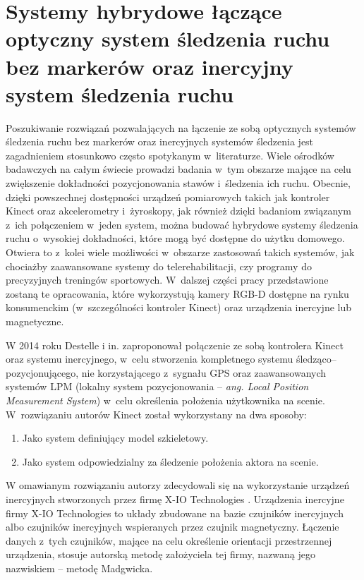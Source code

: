 \section{Systemy hybrydowe łączące optyczny system śledzenia ruchu bez markerów oraz inercyjny system śledzenia ruchu} \label{sec:literature:hybrids}
Poszukiwanie rozwiązań pozwalających na łączenie ze sobą optycznych systemów śledzenia ruchu bez markerów oraz inercyjnych systemów śledzenia jest zagadnieniem stosunkowo często spotykanym w~literaturze. Wiele ośrodków badawczych na całym świecie prowadzi badania w~tym obszarze mające na celu zwiększenie dokładności pozycjonowania stawów i~śledzenia ich ruchu. Obecnie, dzięki powszechnej dostępności urządzeń pomiarowych takich jak kontroler Kinect oraz akcelerometry i~żyroskopy, jak również dzięki badaniom związanym z~ich połączeniem w~jeden system, można budować hybrydowe systemy śledzenia ruchu o~wysokiej dokładności, które mogą być dostępne do użytku domowego. Otwiera to z~kolei wiele możliwości w~obszarze zastosowań takich systemów, jak chociażby zaawansowane systemy do telerehabilitacji, czy programy do precyzyjnych treningów sportowych. W~dalszej części pracy przedstawione zostaną te opracowania, które wykorzystują kamery RGB-D dostępne na rynku konsumenckim (w~szczególności kontroler Kinect) oraz urządzenia inercyjne lub magnetyczne. 

W 2014 roku Destelle i in. \cite{Destelle2014} zaproponował połączenie ze sobą kontrolera Kinect oraz systemu inercyjnego, w~celu stworzenia kompletnego systemu śledząco--pozycjonującego, nie korzystającego z~sygnału GPS oraz zaawansowanych systemów LPM (lokalny system pozycjonowania -- \emph{ang. Local Position Measurement System}) w~celu określenia położenia użytkownika na scenie. W~rozwiązaniu autorów Kinect został wykorzystany na dwa sposoby:
\begin{enumerate}
	\item Jako system definiujący model szkieletowy.
	\item Jako system odpowiedzialny za śledzenie położenia aktora na scenie.
\end{enumerate}
																																																	
W omawianym rozwiązaniu autorzy zdecydowali się na wykorzystanie urządzeń inercyjnych stworzonych przez firmę X-IO Technologies . Urządzenia inercyjne firmy X-IO Technologies to układy zbudowane na bazie czujników inercyjnych albo czujników inercyjnych wspieranych przez czujnik magnetyczny. Łączenie danych z~tych czujników, mające na celu określenie orientacji przestrzennej urządzenia, stosuje autorską metodę założyciela tej firmy, nazwaną jego nazwiskiem -- metodę Madgwicka.

